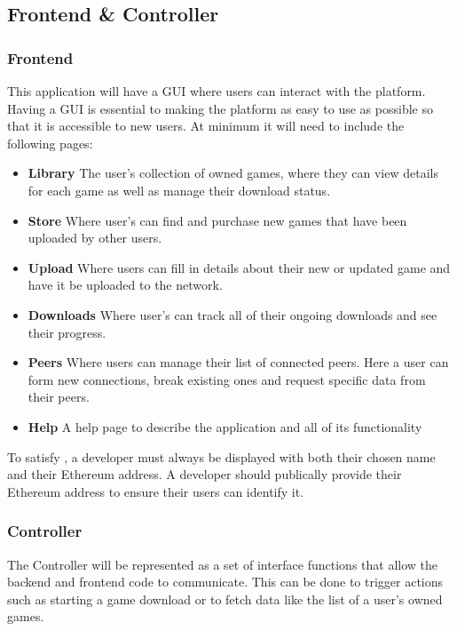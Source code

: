 \subsection{Frontend \& Controller}

\subsubsection{Frontend}\label{subsubsec:frontend}

This application will have a GUI   where users can interact with the platform. Having a GUI is essential to making the platform as easy to use as possible so that it is accessible to new users. At minimum it will need to include the following pages:

\begin{itemize}
  \item \textbf{Library} The user's collection of owned games, where they can view details for each game as well as manage their download status.
  \item \textbf{Store} Where user's can find and purchase new games that have been uploaded by other users.
  \item \textbf{Upload} Where users can fill in details about their new or updated game and have it be uploaded to the network.
  \item \textbf{Downloads} Where user's can track all of their ongoing downloads and see their progress.
  \item \textbf{Peers} Where users can manage their list of connected peers. Here a user can form new connections, break existing ones and request specific data from their peers.
  \item \textbf{Help} A help page to describe the application and all of its functionality 
\end{itemize}

\newparagraph
To satisfy , a developer must always be displayed with both their chosen name and their Ethereum address. A developer should publically provide their Ethereum address to ensure their users can identify it.

\subsubsection{Controller}

The Controller will be represented as a set of interface functions that allow the backend and frontend code to communicate. This can be done to trigger actions such as starting a game download or to fetch data like the list of a user's owned games.
